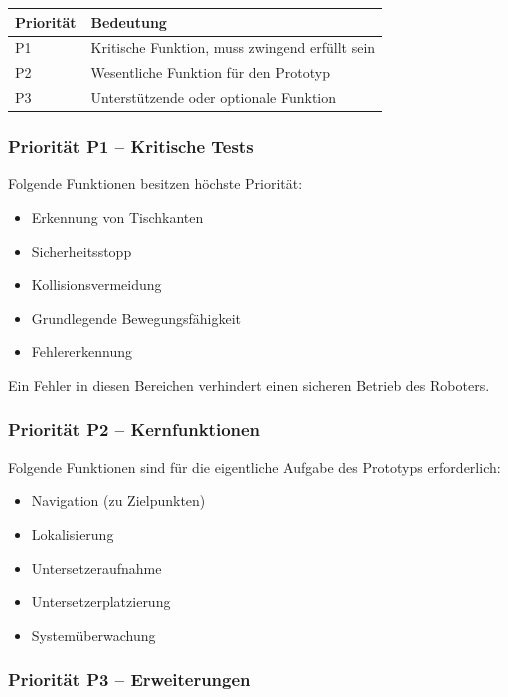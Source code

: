\documentclass[
  a4paper,
  12pt,
  DIV=12,        %
  parskip=half,  %
  headings=small %
]{scrartcl}
\theoremstyle{definition}
\providecommand{\tightlist}{%
  \setlength{\itemsep}{0pt}\setlength{\parskip}{0pt}}
\theoremstyle{definition}
\begin{document}
\begin{longtable}[]{@{}ll@{}}
\toprule\noalign{}
Priorität & Bedeutung \\
\midrule\noalign{}
\endhead
\bottomrule\noalign{}
\endlastfoot
P1 & Kritische Funktion, muss zwingend erfüllt sein \\
P2 & Wesentliche Funktion für den Prototyp \\
P3 & Unterstützende oder optionale Funktion \\
\end{longtable}

\subsubsection{Priorität P1 -- Kritische
Tests}\label{priorituxe4t-p1-kritische-tests}

Folgende Funktionen besitzen höchste Priorität:

\begin{itemize}
\tightlist
\item
  Erkennung von Tischkanten
\item
  Sicherheitsstopp
\item
  Kollisionsvermeidung
\item
  Grundlegende Bewegungsfähigkeit
\item
  Fehlererkennung
\end{itemize}

Ein Fehler in diesen Bereichen verhindert einen sicheren Betrieb des
Roboters.

\subsubsection{Priorität P2 --
Kernfunktionen}\label{priorituxe4t-p2-kernfunktionen}

Folgende Funktionen sind für die eigentliche Aufgabe des Prototyps
erforderlich:

\begin{itemize}
\tightlist
\item
  Navigation (zu Zielpunkten)
\item
  Lokalisierung
\item
  Untersetzeraufnahme
\item
  Untersetzerplatzierung
\item
  Systemüberwachung
\end{itemize}

\subsubsection{Priorität P3 --
Erweiterungen}\label{priorituxe4t-p3-erweiterungen}
\end{document}
